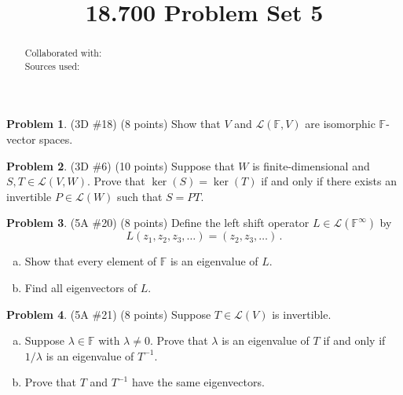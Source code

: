 \documentclass[reqno, 12pt]{amsart}
\theoremstyle{definition}
\newenvironment{problab}[1]
{\noindent\textbf{Problem #1}.}
{\vskip 6pt}
\theoremstyle{remark}
\newtheorem*{soln}{Solution}
\newcommand{\F}{\mathbb F}
\renewcommand{\L}{\mathcal L}
\renewcommand{\abstractname}{}    %
\begin{document}

\title{18.700 Problem Set 5}

\maketitle

\begin{abstract}
  \noindent Collaborated with:\\
  Sources used: 
\end{abstract}
\vskip 0.5cm

\begin{problab}{1} (3D \#18) (8 points)
  Show that $V$ and $\L(\F, V)$ are isomorphic $\F$-vector spaces.
\end{problab}


\begin{problab}{2} (3D \#6) (10 points)
  Suppose that $W$ is finite-dimensional and $S,T \in \L(V,W)$. Prove that $\ker(S) = \ker(T)$ if and only if there exists an invertible $P \in \L(W)$ such that $S = PT$.
\end{problab}

\begin{problab}{3} (5A \#20) (8 points)
  Define the left shift operator $L \in \L(\F^\infty)$ by
  \begin{equation*}
    L(z_1, z_2, z_3, \ldots) = (z_2, z_3, \ldots) \, .
  \end{equation*}
  \begin{enumerate}[(a)]
    \item 
      Show that every element of $\F$ is an eigenvalue of $L$.
    \item
      Find all eigenvectors of $L$.
  \end{enumerate}
\end{problab}

\begin{problab}{4} (5A \#21) (8 points)
  Suppose $T \in \L(V)$ is invertible.
  \begin{enumerate}[(a)]
    \item 
      Suppose $\lambda \in \F$ with $\lambda \neq 0$. Prove that $\lambda$ is an eigenvalue of $T$ if and only if $1/\lambda$ is an eigenvalue of $T^{-1}$.
    \item
      Prove that $T$ and $T^{-1}$ have the same eigenvectors.
  \end{enumerate}
\end{problab}
\end{document}
